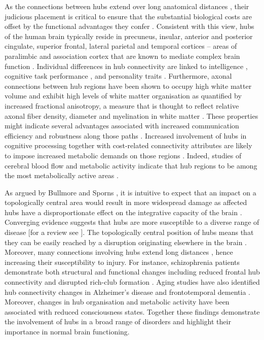 As the connections between hubs extend over long anatomical distances \citep{Fulcher2016,Towlson2013,VandenHeuvel2011}, their judicious placement is critical to ensure that the substantial biological costs are offset by the functional advantages they confer \citep{DeReus2014,Towlson2013}. Consistent with this view, hubs of the human brain typically reside in precuneus, insular, anterior and posterior cingulate, superior frontal, lateral parietal and temporal cortices \citep{Gong2009,VandenHeuvel2012,VandenHeuvel2013a} -- areas of paralimbic and association cortex that are known to mediate complex brain function \citep{Buckner2009,Mesulam1998}. Individual differences in hub connectivity are linked to intelligence \citep{Li2009,VandenHeuvel2009}, cognitive task performance \citep{Cole2012}, and personality traits \citep{Adelstein2011}. Furthermore, axonal connections between hub regions have been shown to occupy high white matter volume and exhibit high levels of white matter organisation as quantified by increased fractional anisotropy, a measure that is thought to reflect relative axonal fiber density, diameter and myelination in white matter \citep{Collin2014}. These properties might indicate several advantages associated with increased communication efficiency and robustness along those paths \citep{Collin2014}. Increased involvement of hubs in cognitive processing \citep{Buckner2009,Cole2012,Mesulam1998} together with cost-related connectivity attributes are likely to impose increased metabolic demands on those regions \citep{Collin2014}. Indeed, studies of cerebral blood flow and metabolic activity indicate that hub regions to be among the most metabolically active areas \citep{Vaishnavi2010,Varkuti2011}. 


As argued by Bullmore and Sporns \citep{Bullmore2012}, it is intuitive to expect that an impact on a topologically central area would result in more widespread damage as affected hubs have a disproportionate effect on the integrative capacity of the brain \citep{DeReus2014}. Converging evidence suggests that hubs are more susceptible to a diverse range of disease [for a review see \citet{Bassett2009a,Crossley2014,Fornito2015b}]. The topologically central position of hubs means that they can be easily reached by a disruption originating elsewhere in the brain \citep{Zhou2012}. Moreover, many connections involving hubs extend long distances \citep{VandenHeuvel2012}, hence increasing their susceptibility to injury. For instance, schizophrenia patients demonstrate both structural and functional changes including reduced frontal hub connectivity \citep{Fornito2012a,VandenHeuvel2010,Zalesky2011} and disrupted rich-club formation \citep{VandenHeuvel2013c}. Aging studies have also identified hub connectivity changes in Alzheimer’s disease \citep{DeHaan2012,Stam2009} and frontotemporal dementia \citep{Agosta2013}. Moreover, changes in hub organisation \citep{Achard2012} and metabolic activity \citep{Laureys2004} have been associated with reduced consciousness states. Together these findings demonstrate the involvement of hubs in a broad range of disorders and highlight their importance in normal brain functioning. 

